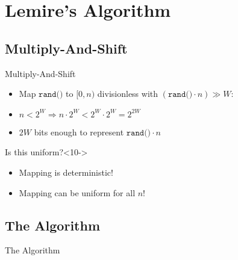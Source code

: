\section{Lemire's Algorithm}

\subsection{Multiply-And-Shift}\label{sec:3.1}
\begin{frame}{Multiply-And-Shift}
    \pause 
    \begin{itemize}
        \item Map $\texttt{rand()}$ to $[0,n)$ divisionless with $(\texttt{rand()} \cdot n) \gg W$:
        \only<5>{\begin{align*}\large
            (\underbrace{\texttt{rand()}}_{\in [0,2^W)} \cdot n) \div W  
        \end{align*}}
        \only<6-8>{\begin{align*}\large
            \underbrace{(\texttt{rand()} \cdot n)}_{\in [0,n \cdot 2^W)} \div W  
        \end{align*}}
        \only<9->{\begin{align*}\large
            \underbrace{(\texttt{rand()} \cdot n) \div W }_{\in [0,n)}
        \end{align*}}
        \item<7-> $n < 2^W \Longrightarrow n \cdot 2^W < 2^W \cdot 2^W = 2^{2W}$
        \item<8-> $2W$ bits enough to represent $\texttt{rand()} \cdot n$  
    \end{itemize}
    \vspace*{0.5cm}
    \begin{block}{Is this uniform?}<10->
        \begin{itemize}
            \item<11-> Mapping is deterministic!
            \item<12-> Mapping can  be uniform for all $n$!
        \end{itemize}
    \end{block}
\end{frame}

\subsection{The Algorithm}\label{sec:3.2}
\begin{frame}{The Algorithm}
    \pause 
    

\end{frame}